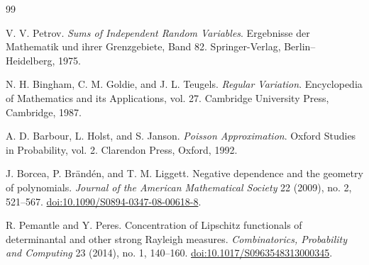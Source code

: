 \documentclass[11pt]{article}
\theoremstyle{remark}
\begin{document}

\begin{thebibliography}{99}

V. V. Petrov.
\newblock \emph{Sums of Independent Random Variables}.
\newblock Ergebnisse der Mathematik und ihrer Grenzgebiete, Band 82.
\newblock Springer-Verlag, Berlin--Heidelberg, 1975.

N. H. Bingham, C. M. Goldie, and J. L. Teugels.
\newblock \emph{Regular Variation}.
\newblock Encyclopedia of Mathematics and its Applications, vol. 27.
\newblock Cambridge University Press, Cambridge, 1987.

A. D. Barbour, L. Holst, and S. Janson.
\newblock \emph{Poisson Approximation}.
\newblock Oxford Studies in Probability, vol. 2.
\newblock Clarendon Press, Oxford, 1992.

J. Borcea, P. Br\"and\'en, and T. M. Liggett.
\newblock Negative dependence and the geometry of polynomials.
\newblock \emph{Journal of the American Mathematical Society} 22 (2009),
no. 2, 521--567.
\newblock \href{https://doi.org/10.1090/S0894-0347-08-00618-8}
{doi:10.1090/S0894-0347-08-00618-8}.

R. Pemantle and Y. Peres.
\newblock Concentration of Lipschitz functionals of determinantal and other
strong Rayleigh measures.
\newblock \emph{Combinatorics, Probability and Computing} 23 (2014), no. 1,
140--160.
\newblock \href{https://doi.org/10.1017/S0963548313000345}
{doi:10.1017/S0963548313000345}.

\end{thebibliography}
\end{document}
